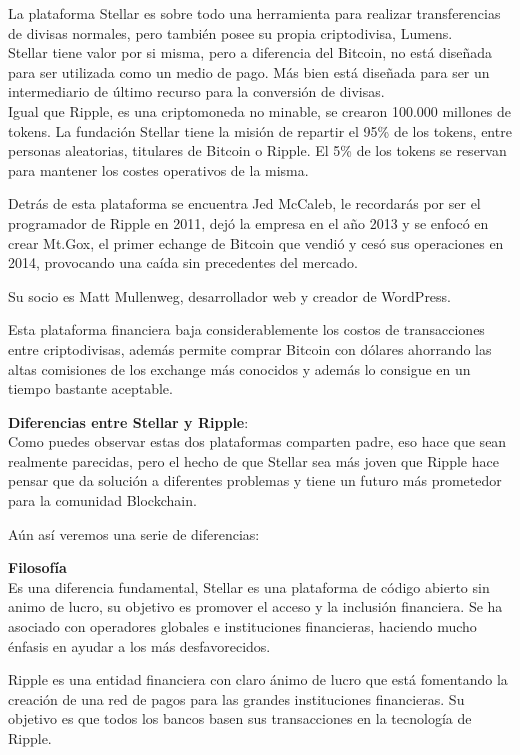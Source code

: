 \documentclass[a4paper,12pt]{/home/armando/Documentos/Cursos/LaTeX/Plantillas/lib/pub}
\begin{document}
	La plataforma Stellar es sobre todo una herramienta para realizar transferencias de divisas normales, pero también posee su propia criptodivisa, Lumens.
	\\
	Stellar tiene valor por si misma, pero a diferencia del Bitcoin, no está diseñada para ser utilizada como un medio de pago. Más bien está diseñada para ser un intermediario de último recurso para la conversión de divisas.
	\\
	Igual que Ripple, es una criptomoneda no minable, se crearon 100.000 millones de tokens. La fundación Stellar tiene la misión de repartir el 95\% de los tokens, entre personas aleatorias, titulares de Bitcoin o Ripple. El 5\% de los tokens se reservan para mantener los costes operativos de la misma.
	
	Detrás de esta plataforma se encuentra Jed McCaleb, le recordarás por ser el programador de Ripple en 2011, dejó la empresa en el año 2013 y se enfocó en crear Mt.Gox, el primer echange de Bitcoin que vendió y cesó sus operaciones en 2014, provocando una caída sin precedentes del mercado.
	
	Su socio es Matt Mullenweg, desarrollador web y creador de WordPress.
	
	Esta plataforma financiera baja considerablemente los costos de transacciones entre criptodivisas, además permite comprar Bitcoin con dólares ahorrando las altas comisiones de los exchange más conocidos y además lo consigue en un tiempo bastante aceptable.
	
	\textbf{Diferencias entre Stellar y Ripple}:\\
	
	Como puedes observar estas dos plataformas comparten padre, eso hace que sean realmente parecidas, pero el hecho de que Stellar sea más joven que Ripple hace pensar que da solución a diferentes problemas y tiene un futuro más prometedor para la comunidad Blockchain.
	
	Aún así veremos una serie de diferencias:
	
	\textbf{Filosofía}\\
	Es una diferencia fundamental, Stellar es una plataforma de código abierto sin animo de lucro, su objetivo es promover el acceso y la inclusión financiera. Se ha asociado con operadores globales e instituciones financieras, haciendo mucho énfasis en ayudar a los más desfavorecidos.
	
	Ripple es una entidad financiera con claro ánimo de lucro que está fomentando la creación de una red de pagos para las grandes instituciones financieras. Su objetivo es que todos los bancos basen sus transacciones en la tecnología de Ripple.
	
\end{document}
